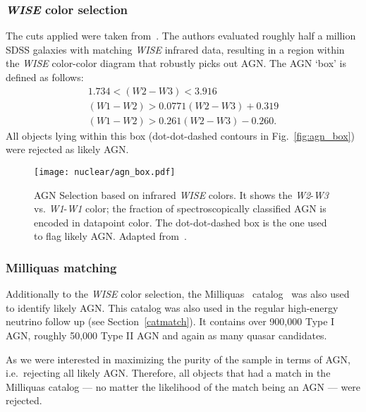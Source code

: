 \subsubsection{\textit{WISE} color selection}\label{wise_color_cut}
The cuts applied were taken from~\cite{Hviding2022}. The authors evaluated roughly half a million SDSS galaxies with matching \textit{WISE} infrared data, resulting in a region within the \textit{WISE} color-color diagram that robustly picks out AGN. The AGN `box' is defined as follows:
\begin{subequations}
  \begin{eqnarray}
    1.734 < (\textit{W2}-\textit{W3}) < 3.916 \\
    (\textit{W1}-\textit{W2}) > 0.0771 (\textit{W2}-\textit{W3}) + 0.319 \\
    (\textit{W1}-\textit{W2}) > 0.261 (\textit{W2}-\textit{W3}) - 0.260.
  \end{eqnarray}
\end{subequations}
All objects lying within this box (dot-dot-dashed contours in Fig.~\ref{fig:agn_box}) were rejected as likely AGN.

\begin{figure}[htpb]
  \texttt{[image: nuclear/agn\_box.pdf]}
  \caption[Infrared AGN selection]{AGN Selection based on infrared \textit{WISE} colors. It shows the \textit{W2}-\textit{W3} vs. \textit{W1}-\textit{W1} color; the fraction of spectroscopically classified AGN is encoded in datapoint color. The dot-dot-dashed box is the one used to flag likely AGN. Adapted from~\cite{Hviding2022}.}
\end{figure}

\subsubsection{Milliquas matching}\label{milliquas_cut}
Additionally to the \textit{WISE} color selection, the Milliquas~\cite{Milliquas} catalog~ was also used to identify likely AGN. This catalog was also used in the regular high-energy neutrino follow up (see Section~\ref{catmatch}). It contains over 900,000 Type I AGN, roughly 50,000 Type II AGN and again as many quasar candidates.

As we were interested in maximizing the purity of the sample in terms of AGN, i.e.~rejecting all likely AGN. Therefore, all objects that had a match in the Milliquas catalog --- no matter the likelihood of the match being an AGN --- were rejected.

